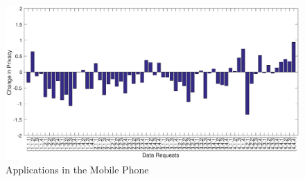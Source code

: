 \begin{figure}[ht!]
\centering
\includegraphics[width=\textwidth,keepaspectratio]{./images/day3_day1_privacy}
\caption{Applications in the Mobile Phone}
\label{fig:pre_q6}
\end{figure}





